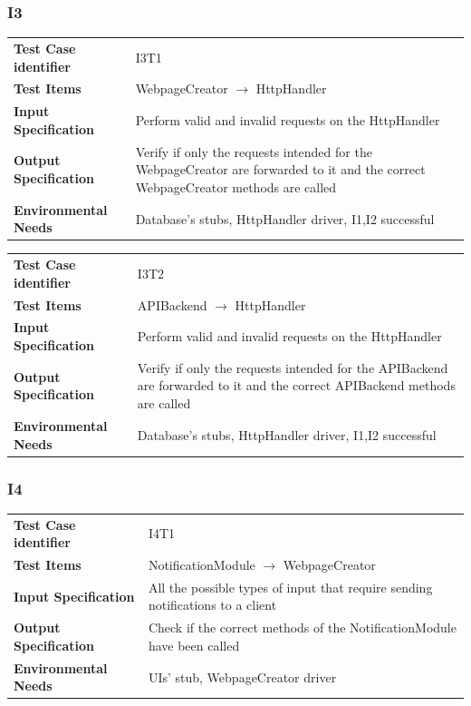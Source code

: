 \documentclass{article}
\begin{document}
\subsubsection{I3}
\begin{adjustbox}{width=1.2\textwidth}	
	\begin{tabular}{*{2}{p{}}}
		\toprule
		\textbf{Test Case identifier} & I3T1\\
		\textbf{Test Items} & WebpageCreator $\rightarrow$ HttpHandler\\
		\textbf{Input Specification} & Perform valid and invalid requests on the HttpHandler\\
		\textbf{Output Specification} & Verify if only the requests intended for 
		the WebpageCreator are forwarded to it and the correct WebpageCreator methods are called\\
		\textbf{Environmental Needs} & Database's stubs, HttpHandler driver, I1,I2 successful\\
		\bottomrule
	\end{tabular}
\end{adjustbox}
\begin{adjustbox}{width=1.2\textwidth}	
	\begin{tabular}{*{2}{p{}}}
		\toprule
		\textbf{Test Case identifier} & I3T2\\
		\textbf{Test Items} & APIBackend $\rightarrow$ HttpHandler\\
		\textbf{Input Specification} & Perform valid and invalid requests on the HttpHandler\\
		\textbf{Output Specification} & Verify if only the requests intended for
		the APIBackend are forwarded to it and the correct APIBackend methods are called\\
		\textbf{Environmental Needs} & Database's stubs, HttpHandler driver, I1,I2 successful\\
		\bottomrule
	\end{tabular}
\end{adjustbox}
\subsubsection{I4}
\begin{adjustbox}{width=1.2\textwidth}	
	\begin{tabular}{*{2}{p{}}}
		\toprule
		\textbf{Test Case identifier} & I4T1\\
		\textbf{Test Items} & NotificationModule $\rightarrow$ WebpageCreator\\
		\textbf{Input Specification} & All the possible types of input that require sending notifications to a client \\ 
		\textbf{Output Specification} & Check if the correct methods of the NotificationModule have been called\\
		\textbf{Environmental Needs} & UIs' stub, WebpageCreator driver\\
		\bottomrule
	\end{tabular}
\end{adjustbox}
\end{document}
